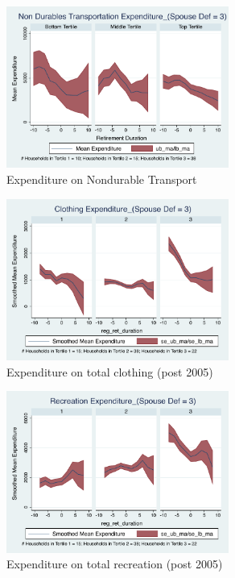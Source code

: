\documentclass[11pt,onecolumn]{article}
\numberwithin{figure}{section}
\begin{document}
\begin{figure}[h]
	\caption{Expenditure on Nondurable Transport}
	\centering
	\includegraphics[width=0.65\textwidth]{../ConsumptionPostRetirement_by_SpouseDef_Cats/Smoothed/3/spouse_def_total_transport_real.pdf}
\end{figure}
\clearpage

\begin{figure}[h]
	\caption{Expenditure on total clothing (post 2005)}
	\centering
	\includegraphics[width=0.65\textwidth]{../ConsumptionPostRetirement_by_SpouseDef_Cats/Smoothed/3/spouse_def_total_clothing_2005_real.pdf}
\end{figure}

\begin{figure}[h]
	\caption{Expenditure on total recreation (post 2005)}
	\centering
	\includegraphics[width=0.65\textwidth]{../ConsumptionPostRetirement_by_SpouseDef_Cats/Smoothed/3/spouse_def_total_recreation_2005_real.pdf}
\end{figure}
\end{document}
